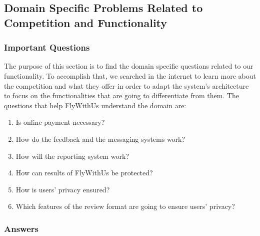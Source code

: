\newpage
\subsection{Domain Specific Problems Related to Competition and Functionality}
\subsubsection{Important Questions}
The purpose of this section is to find the domain specific questions related to our functionality. To accomplish that, we searched in the internet to learn more about the competition and what they offer in order to adapt the system's architecture to focus on the functionalities that are going to differentiate from them. The questions that help FlyWithUs understand the domain are:
\begin{enumerate}
\item Is online payment necessary?
\item How do the feedback and the messaging systems work?
\item How will the reporting system work?
\item How can results of FlyWithUs be protected?
\item How is users' privacy ensured?
\item Which features of the review format are going to ensure users' privacy?
\end{enumerate}

\subsubsection{Answers}

